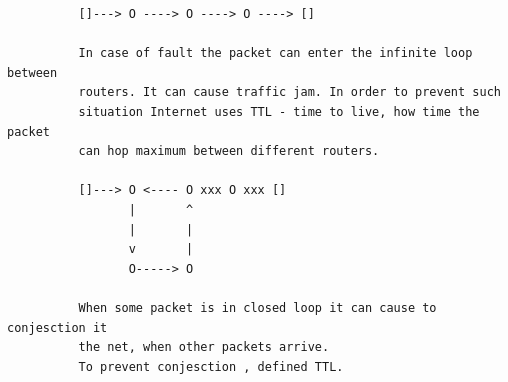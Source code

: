 \documentclass[a4paper,12pt]{article}
\begin{document}
\begin{verbatim}
          []---> O ----> O ----> O ----> []      
                    
          In case of fault the packet can enter the infinite loop between 
          routers. It can cause traffic jam. In order to prevent such 
          situation Internet uses TTL - time to live, how time the packet
          can hop maximum between different routers.
        
          []---> O <---- O xxx O xxx []      
                 |       ^
                 |       | 
                 v       |
                 O-----> O

          When some packet is in closed loop it can cause to conjesction it
          the net, when other packets arrive. 
          To prevent conjesction , defined TTL.
\end{verbatim}
\end{document}

